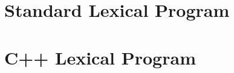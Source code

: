 \documentclass[12pt]{article}
\newenvironment{indpar}[1][0.3in]%
	{\begin{list}{}%
		     {\setlength{\itemsep}{0in}%
		      \setlength{\topsep}{0in}%
		      \setlength{\parsep}{1ex}%
		      \setlength{\labelwidth}{#1}%
		      \setlength{\leftmargin}{#1}%
		      \addtolength{\leftmargin}{\labelsep}}%
	 \item}%
	{\end{list}}
\begin{document}
\clearpage

\appendix

\section{Standard Lexical Program}
\label{STANDARD-LEXICAL-PROGRAM}

\begin{indpar}

\end{indpar}

\newpage

\section{C++ Lexical Program}
\label{C++-LEXICAL-PROGRAM}

\begin{indpar}

\end{indpar}




\printindex
\end{document}
